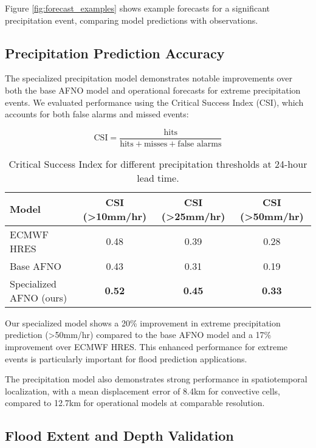 \documentclass{article}
\begin{document}
Figure \ref{fig:forecast_examples} shows example forecasts for a significant precipitation event, comparing model predictions with observations.

\subsection{Precipitation Prediction Accuracy}

The specialized precipitation model demonstrates notable improvements over both the base AFNO model and operational forecasts for extreme precipitation events. We evaluated performance using the Critical Success Index (CSI), which accounts for both false alarms and missed events:

\begin{equation}
\text{CSI} = \frac{\text{hits}}{\text{hits} + \text{misses} + \text{false alarms}}
\end{equation}

\begin{table}[h]
    \centering
    \begin{tabular}{l|c|c|c}
        \hline
        \textbf{Model} & \textbf{CSI (>10mm/hr)} & \textbf{CSI (>25mm/hr)} & \textbf{CSI (>50mm/hr)} \\
        \hline
        ECMWF HRES & 0.48 & 0.39 & 0.28 \\
        Base AFNO & 0.43 & 0.31 & 0.19 \\
        Specialized AFNO (ours) & \textbf{0.52} & \textbf{0.45} & \textbf{0.33} \\
        \hline
    \end{tabular}
    \caption{Critical Success Index for different precipitation thresholds at 24-hour lead time.}
    \label{tab:precip_performance}
\end{table}

Our specialized model shows a 20\% improvement in extreme precipitation prediction (>50mm/hr) compared to the base AFNO model and a 17\% improvement over ECMWF HRES. This enhanced performance for extreme events is particularly important for flood prediction applications.

The precipitation model also demonstrates strong performance in spatiotemporal localization, with a mean displacement error of 8.4km for convective cells, compared to 12.7km for operational models at comparable resolution.

\subsection{Flood Extent and Depth Validation}
\end{document}
